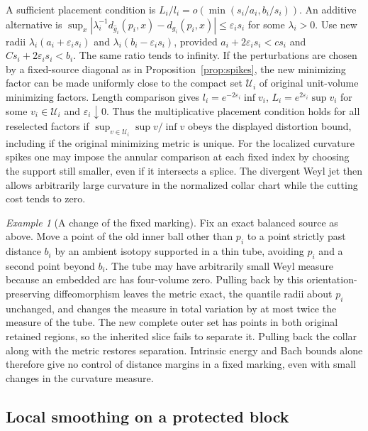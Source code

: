 \documentclass[11pt]{article}
\numberwithin{equation}{section}
\theoremstyle{definition}
\theoremstyle{remark}
\newtheorem{example}[theorem]{Example}
\renewcommand{\epsilon}{\varepsilon}
\begin{document}
A sufficient placement condition is
\(L_i/l_i=o(\min(s_i/a_i,b_i/s_i))\).
An additive alternative is
\(\sup_x|\lambda_i^{-1}d_{\widehat g_i}(p_i,x)-
d_{g_i}(p_i,x)|\le\epsilon_i s_i\) for some \(\lambda_i>0\).
Use new radii \(\lambda_i(a_i+\epsilon_i s_i)\) and
\(\lambda_i(b_i-\epsilon_i s_i)\), provided
\(a_i+2\epsilon_i s_i<c s_i\) and
\(C s_i+2\epsilon_i s_i<b_i\).
The same ratio tends to infinity. If the perturbations
are chosen by a fixed-source diagonal as in
Proposition~\ref{prop:spikes}, the new minimizing factor
can be made uniformly close to the compact set
\(\mathcal U_i\) of original unit-volume minimizing
factors. Length comparison gives
\(l_i=e^{-2\epsilon_i}\inf v_i\),
\(L_i=e^{2\epsilon_i}\sup v_i\) for some \(v_i\in\mathcal U_i\)
and \(\epsilon_i\downarrow0\).
Thus the multiplicative placement condition holds for
all reselected factors if
\(\sup_{v\in\mathcal U_i}\sup v/\inf v\)
obeys the displayed distortion bound, including if the
original minimizing metric is unique. For the localized
curvature spikes one may impose the annular comparison
at each fixed index by choosing the support still smaller,
even if it intersects a splice. The divergent Weyl jet
then allows arbitrarily large curvature in the normalized
collar chart while the cutting cost tends to zero.

\begin{example}[A change of the fixed marking]
Fix an exact balanced source as above. Move a point of
the old inner ball other than \(p_i\) to a point strictly
past distance \(b_i\) by an ambient isotopy supported in
a thin tube, avoiding \(p_i\) and a second point beyond
\(b_i\). The tube may have arbitrarily small Weyl measure
because an embedded arc has four-volume zero. Pulling
back by this orientation-preserving diffeomorphism leaves
the metric exact, the quantile radii about \(p_i\)
unchanged, and changes the measure in total variation
by at most twice the measure of the tube. The new
complete outer set has points in both original retained
regions, so the inherited slice fails to separate it.
Pulling back the collar along with the metric restores
separation. Intrinsic energy and Bach bounds alone
therefore give no control of distance margins in a fixed
marking, even with small changes in the curvature measure.
\end{example}

\subsection{Local smoothing on a protected block}
\end{document}

